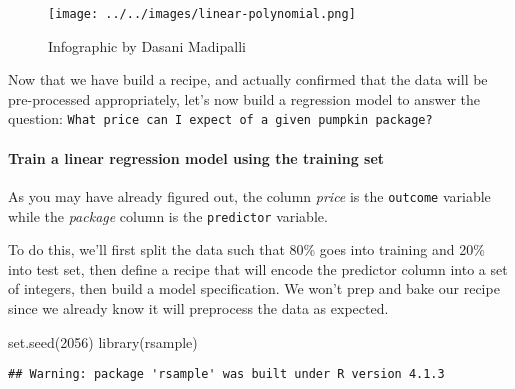 \documentclass[
]{article}
\newenvironment{Shaded}{\begin{snugshade}}{\end{snugshade}}
\newcommand{\DecValTok}[1]{\textcolor[rgb]{0.00,0.00,0.81}{#1}}
\newcommand{\FunctionTok}[1]{\textcolor[rgb]{0.00,0.00,0.00}{#1}}
\newcommand{\NormalTok}[1]{#1}
\begin{document}
\begin{figure}
\centering
\texttt{[image: ../../images/linear-polynomial.png]}
\caption{Infographic by Dasani Madipalli}
\end{figure}

Now that we have build a recipe, and actually confirmed that the data
will be pre-processed appropriately, let's now build a regression model
to answer the question:
\texttt{What\ price\ can\ I\ expect\ of\ a\ given\ pumpkin\ package?}

\hypertarget{train-a-linear-regression-model-using-the-training-set}{%
\paragraph{Train a linear regression model using the training
set}\label{train-a-linear-regression-model-using-the-training-set}}

As you may have already figured out, the column \emph{price} is the
\texttt{outcome} variable while the \emph{package} column is the
\texttt{predictor} variable.

To do this, we'll first split the data such that 80\% goes into training
and 20\% into test set, then define a recipe that will encode the
predictor column into a set of integers, then build a model
specification. We won't prep and bake our recipe since we already know
it will preprocess the data as expected.

\begin{Shaded}
\begin{Highlighting}[]
\FunctionTok{set.seed}\NormalTok{(}\DecValTok{2056}\NormalTok{)}
\FunctionTok{library}\NormalTok{(rsample)}
\end{Highlighting}
\end{Shaded}

\begin{verbatim}
## Warning: package 'rsample' was built under R version 4.1.3
\end{verbatim}
\end{document}
